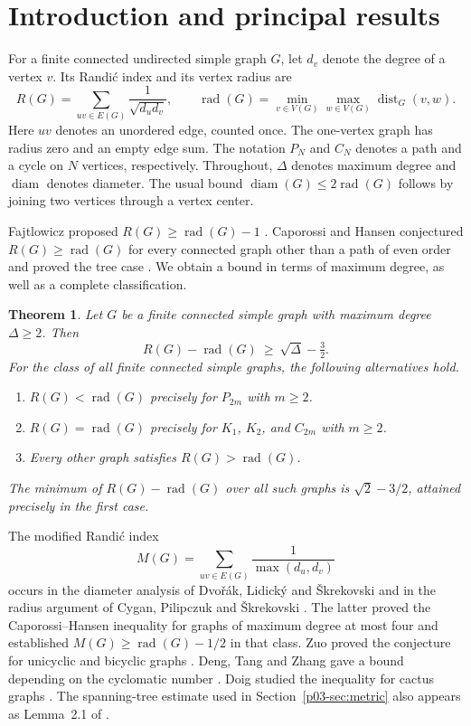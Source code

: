 \documentclass[11pt,a4paper]{article}
\newtheorem{theorem}{Theorem}[section]
\newcommand{\rad}{\operatorname{rad}}\newcommand{\diam}{\operatorname{diam}}
\newcommand{\dist}{\operatorname{dist}}\newcommand{\ecc}{\operatorname{ecc}}
\begin{document}
\section{Introduction and principal results}
For a finite connected undirected simple graph $G$, let $d_v$ denote the
degree of a vertex $v$. Its Randi\'c index and its vertex radius are
\[
 R(G)=\sum_{uv\in E(G)}\frac{1}{\sqrt{d_ud_v}},\qquad
 \rad(G)=\min_{v\in V(G)}\max_{w\in V(G)}\dist_G(v,w).
\]
Here $uv$ denotes an unordered edge, counted once. The one-vertex graph
has radius zero and an empty edge sum. The notation $P_N$ and $C_N$
denotes a path and a cycle on $N$ vertices, respectively. Throughout,
$\Delta$ denotes maximum degree and $\diam$ denotes diameter. The usual
bound $\diam(G)\le2\rad(G)$ follows by joining two vertices through a
vertex center.

Fajtlowicz proposed $R(G)\ge\rad(G)-1$ \cite{p03-Faj}. Caporossi and Hansen
conjectured $R(G)\ge\rad(G)$ for every connected graph other than a
path of even order and proved the tree case \cite{p03-CH,p03-Zuo}. We obtain a
bound in terms of maximum degree, as well as a complete classification.
\begin{theorem}\label{p03-thm:main}
Let $G$ be a finite connected simple graph with maximum degree $\Delta\ge2$.
Then
\begin{equation}\label{p03-eq:main}
 R(G)-\rad(G)\ \ge\ \sqrt{\Delta}-\tfrac32.
\end{equation}
For the class of all finite connected simple graphs, the following alternatives hold.
\begin{enumerate}
\item $R(G)<\rad(G)$ precisely for $P_{2m}$ with $m\ge2$.
\item $R(G)=\rad(G)$ precisely for $K_1$, $K_2$, and $C_{2m}$ with $m\ge2$.
\item Every other graph satisfies $R(G)>\rad(G)$.
\end{enumerate}
The minimum of $R(G)-\rad(G)$ over all such graphs is $\sqrt2-3/2$,
attained precisely in the first case.
\end{theorem}

The modified Randi\'c index
\[
 M(G)=\sum_{uv\in E(G)}\frac1{\max(d_u,d_v)}
\]
occurs in the diameter analysis of Dvo\v{r}\'ak, Lidick\'y and
\v{S}krekovski \cite{p03-DLS} and in the radius argument of Cygan, Pilipczuk
and \v{S}krekovski \cite{p03-CPS}. The latter proved the Caporossi--Hansen
inequality for graphs of maximum degree at most four and established
$M(G)\ge\rad(G)-1/2$ in that class. Zuo proved the conjecture for
unicyclic and bicyclic graphs \cite{p03-Zuo}. Deng, Tang and Zhang gave a
bound depending on the cyclomatic number \cite{p03-Deng}. Doig studied the
inequality for cactus graphs \cite{p03-Doig}. The spanning-tree estimate used
in Section~\ref{p03-sec:metric} also appears as Lemma~2.1 of \cite{p03-CPS}.
\end{document}
